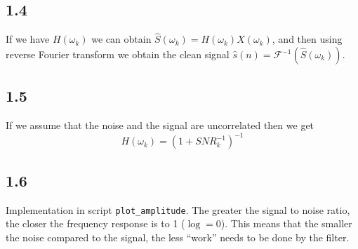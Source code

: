 \documentclass[a4paper]{article}
\newcommand{\TT}[1] {\texttt{#1}}
\newcommand{\B}[1] {\left(#1\right)}
\def\F {\mathcal{F}}
\def\w {\omega}
\begin{document}
\subsection*{1.4}

If we have $ H(\w_k) $ we can obtain $ \hat S(\w_k) = H(\w_k)X(\w_k) $, and then using reverse Fourier transform we obtain the clean signal $ \hat s(n) = \F^{-1}(\hat S(\w_k)) $.

\subsection*{1.5}

If we assume that the noise and the signal are uncorrelated then we get
\[
  H(\w_k) = \B{1 + SNR_k^{-1}}^{-1}
\]

\subsection*{1.6}

Implementation in script \TT{plot\_amplitude}. The greater the signal to noise
ratio, the closer the frequency response is to 1 ($ \log = 0 $). This means
that the smaller the noise compared to the signal, the less ``work'' needs to
be done by the filter.
\end{document}

